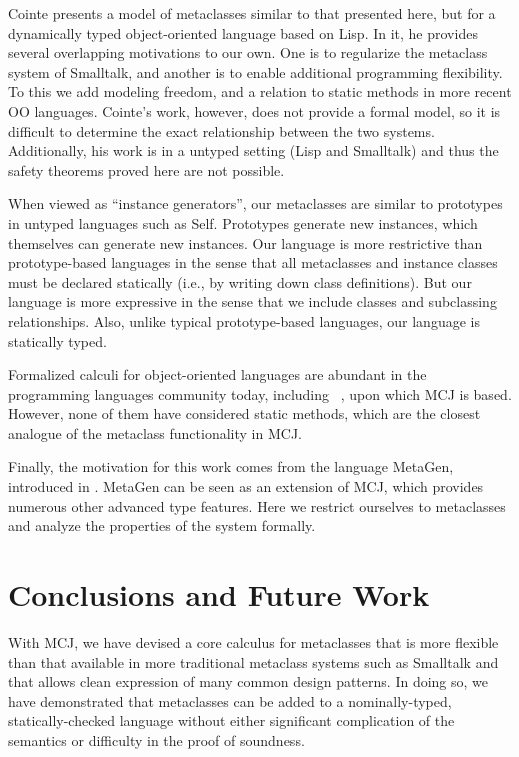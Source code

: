 \documentclass{acm-sigplan}
\begin{document}
Cointe \cite{objvlisp} presents a model of metaclasses
similar to that presented here, but for a dynamically typed object-oriented
language based on Lisp.  In it, he provides several
overlapping motivations to our own.  One is to regularize the
metaclass system of Smalltalk, and another is to enable additional
programming flexibility.  To this we add modeling freedom, and a
relation to static methods in more recent OO languages.  Cointe's
work, however, does not provide a formal model, so it is difficult to
determine the exact relationship between the two systems.  Additionally,
his work is in a untyped setting (Lisp and Smalltalk) and thus the
safety theorems proved here are not possible. 

When viewed as ``instance generators'', our metaclasses are similar to
prototypes in untyped languages such as Self.  Prototypes generate new
instances, which themselves can generate new instances.  Our language
is more restrictive than prototype-based languages in the sense that
all metaclasses and instance classes must be declared statically
(i.e., by writing down class definitions).  But our language is more
expressive in the sense that we include classes and subclassing
relationships.  Also, unlike typical prototype-based languages, our
language is statically typed.

Formalized calculi for object-oriented languages are abundant in the
programming languages community today, including \FJ\ \cite{FJ}, upon
which MCJ is based.  However, none of them have considered static
methods, which are the closest analogue of the metaclass functionality
in MCJ.

Finally, the motivation for this work comes from the language MetaGen,
introduced in \cite{DimUnits}.  MetaGen can be seen as an extension of
MCJ, which provides numerous other advanced type features.  Here we
restrict ourselves to metaclasses and analyze the properties of the
system formally.

\section{Conclusions and Future Work}
\label{future}
With MCJ, we have devised a core calculus for metaclasses that is more
flexible than that available in more traditional metaclass systems
such as Smalltalk and that allows clean expression of many common
design patterns.  In doing so, we have demonstrated that metaclasses
can be added to a nominally-typed, statically-checked language without
either significant complication of the semantics or difficulty in the
proof of soundness.
\end{document}
